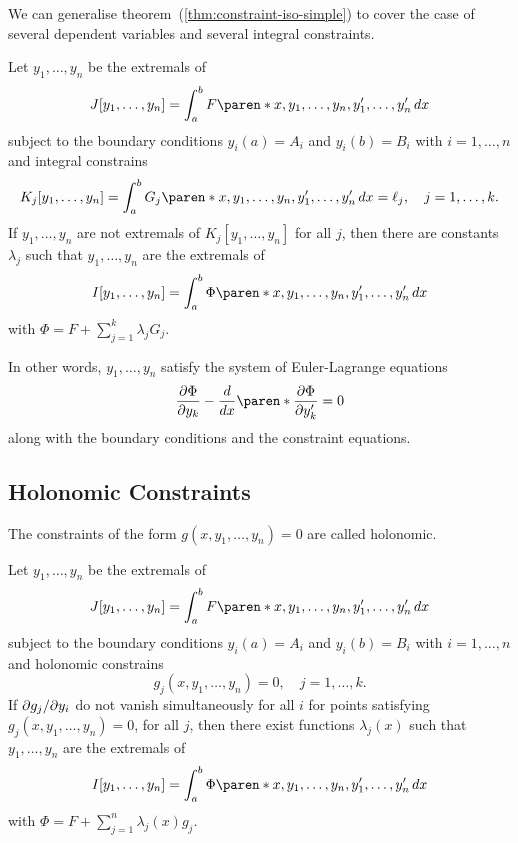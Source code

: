 \documentclass[11pt]{penrose}
\begin{document}
We can generalise theorem~(\ref{thm:constraint-iso-simple}) to cover the case of several dependent variables and several integral constraints.

\begin{nthm}
    Let $y_1, \dots, y_n$ be the extremals of
    \begin{equation}
        J[y_1, \dots, y_n] = \int_a^b F\paren*{x, y_1, \dots, y_n, y'_1, \dots, y'_n} \,dx
    \end{equation}
    subject to the boundary conditions $y_i(a) = A_i$ and $y_i(b) = B_i$ with $i=1, \dots, n$ and integral constrains
    \begin{equation}
        K_j[y_1, \dots, y_n]
        = \int_a^b G_j\paren*{x, y_1, \dots, y_n, y'_1, \dots, y'_n} \,dx
        = \ell_j,
        \quad j = 1, \dots, k.
    \end{equation}
    If $y_1, \dots, y_n$ are not extremals of $K_j[y_1, \dots, y_n]$ for all $j$, then there are constants $\lambda_j$ such that $y_1, \dots, y_n$ are the extremals of
    \begin{equation}
        I[y_1, \dots, y_n] = \int_a^b \Phi\paren*{x, y_1, \dots, y_n, y'_1, \dots, y'_n} \,dx
    \end{equation}
    with $\Phi = F + \sum_{j=1}^{k} \lambda_j G_j$.
\end{nthm}

In other words, $y_1, \dots, y_n$ satisfy the system of Euler-Lagrange equations
\begin{equation}
    \frac{\pd \Phi}{\pd y_k} - \frac{d}{dx} \paren*{\frac{\pd \Phi}{\pd y'_k}} = 0
\end{equation}
along with the boundary conditions and the constraint equations.

\subsection{Holonomic Constraints}
The constraints of the form $g(x, y_1, \dots, y_n) = 0$ are called holonomic.

\begin{nthm}
    Let $y_1, \dots, y_n$ be the extremals of
    \begin{equation}
        J[y_1, \dots, y_n] = \int_a^b F\paren*{x, y_1, \dots, y_n, y'_1, \dots, y'_n} \,dx
    \end{equation}
    subject to the boundary conditions $y_i(a) = A_i$ and $y_i(b) = B_i$ with $i=1, \dots, n$ and holonomic constrains
    \begin{equation}
        g_j(x, y_1, \dots, y_n) = 0,
        \quad j = 1, \dots, k.
    \end{equation}
    If $\partial g_j / \partial y_i$ do not vanish simultaneously for all $i$ for points satisfying $g_j(x, y_1, \dots, y_n) = 0$, for all $j$, then there exist functions $\lambda_j(x)$ such that $y_1, \dots, y_n$ are the extremals of
    \begin{equation}
        I[y_1, \dots, y_n] = \int_a^b \Phi\paren*{x, y_1, \dots, y_n, y'_1, \dots, y'_n} \,dx
    \end{equation}
    with $\Phi = F + \sum_{j=1}^{n} \lambda_j(x) g_j$.
\end{nthm}
\end{document}
